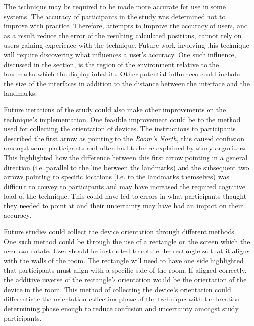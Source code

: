 \documentclass{bmcart}
\begin{document}
The technique may be required to be made more accurate for use in some systems.
The accuracy of participants in the study was determined not to improve with practice.
Therefore, attempts to improve the accuracy of users, and as a result reduce the error of the resulting calculated positions, cannot rely on users gaining experience with the technique.
Future work involving this technique will require discovering what influences a user's accuracy.
One such influence, discussed in the  section, is the region of the environment relative to the landmarks which the display inhabits.
Other potential influences could include the size of the interfaces in addition to the distance between the interface and the landmarks.

Future iterations of the study could also make other improvements on the technique's implementation.
One feasible improvement could be to the method used for collecting the orientation of devices.
The instructions to participants described the first arrow as pointing to the \emph{Room's North}, this caused confusion amongst some participants and often had to be re-explained by study organisers.
This highlighted how the difference between this first arrow pointing in a general direction (i.e. parallel to the line between the landmarks) and the subsequent two arrows pointing to specific locations (i.e. to the landmarks themselves) was difficult to convey to participants and may have increased the required cognitive load of the technique.
This could have led to errors in what participants thought they needed to point at and their uncertainty may have had an impact on their accuracy.

Future studies could collect the device orientation through different methods.
One such method could be through the use of a rectangle on the screen which the user can rotate.
User should be instructed to rotate the rectangle so that it aligns with the walls of the room.
The rectangle will need to have one side highlighted that participants must align with a specific side of the room.
If aligned correctly, the additive inverse of the rectangle's orientation would be the orientation of the device in the room.
This method of collecting the device's orientation could differentiate the orientation collection phase of the technique with the location determining phase enough to reduce confusion and uncertainty amongst study participants.
\end{document}
